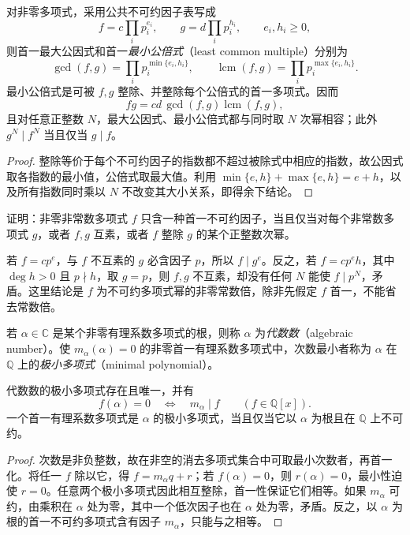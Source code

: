 \begin{proposition}
\label{prop:poly-gcd-lcm}
对非零多项式，采用公共不可约因子表写成
\[
    f=c\prod_i p_i^{e_i},\qquad g=d\prod_i p_i^{h_i},\qquad e_i,h_i\geq0,
\]
则首一最大公因式和首一\emph{最小公倍式}（least common multiple）分别为
\begin{equation}
\label{eq:poly-gcd-lcm}
    \gcd(f,g)=\prod_i p_i^{\min\{e_i,h_i\}},\qquad
    \operatorname{lcm}(f,g)=\prod_i p_i^{\max\{e_i,h_i\}}.
\end{equation}
最小公倍式是可被 $f,g$ 整除、并整除每个公倍式的首一多项式。因而
\[
    fg=cd\,\gcd(f,g)\operatorname{lcm}(f,g),
\]
且对任意正整数 $N$，最大公因式、最小公倍式都与同时取 $N$ 次幂相容；此外 $g^N\mid f^N$ 当且仅当 $g\mid f$。
\end{proposition}
\begin{proof}
整除等价于每个不可约因子的指数都不超过被除式中相应的指数，故公因式取各指数的最小值，公倍式取最大值。利用 $\min\{e,h\}+\max\{e,h\}=e+h$，以及所有指数同时乘以 $N$ 不改变其大小关系，即得余下结论。
\end{proof}

\begin{example}
\label{ex:poly-primary-power}
证明：非零非常数多项式 $f$ 只含一种首一不可约因子，当且仅当对每个非常数多项式 $g$，或者 $f,g$ 互素，或者 $f$ 整除 $g$ 的某个正整数次幂。
\end{example}
\begin{solve}
若 $f=cp^e$，与 $f$ 不互素的 $g$ 必含因子 $p$，所以 $f\mid g^e$。反之，若 $f=cp^eh$，其中 $\deg h>0$ 且 $p\nmid h$，取 $g=p$，则 $f,g$ 不互素，却没有任何 $N$ 能使 $f\mid p^N$，矛盾。这里结论是 $f$ 为不可约多项式幂的非零常数倍，除非先假定 $f$ 首一，不能省去常数倍。
\end{solve}

\begin{definition}
\label{def:poly-minimal}
若 $\alpha\in\mathbb C$ 是某个非零有理系数多项式的根，则称 $\alpha$ 为\emph{代数数}（algebraic number）。使 $m_\alpha(\alpha)=0$ 的非零首一有理系数多项式中，次数最小者称为 $\alpha$ 在 $\mathbb Q$ 上的\emph{极小多项式}（minimal polynomial）。
\end{definition}

\begin{theorem}
\label{thm:poly-minimal}
代数数的极小多项式存在且唯一，并有
\[
    f(\alpha)=0\quad\Longleftrightarrow\quad m_\alpha\mid f
    \qquad(f\in\mathbb Q[x]).
\]
一个首一有理系数多项式是 $\alpha$ 的极小多项式，当且仅当它以 $\alpha$ 为根且在 $\mathbb Q$ 上不可约。
\end{theorem}
\begin{proof}
次数是非负整数，故在非空的消去多项式集合中可取最小次数者，再首一化。将任一 $f$ 除以它，得 $f=m_\alpha q+r$；若 $f(\alpha)=0$，则 $r(\alpha)=0$，最小性迫使 $r=0$。任意两个极小多项式因此相互整除，首一性保证它们相等。如果 $m_\alpha$ 可约，由乘积在 $\alpha$ 处为零，其中一个低次因子也在 $\alpha$ 处为零，矛盾。反之，以 $\alpha$ 为根的首一不可约多项式含有因子 $m_\alpha$，只能与之相等。
\end{proof}

